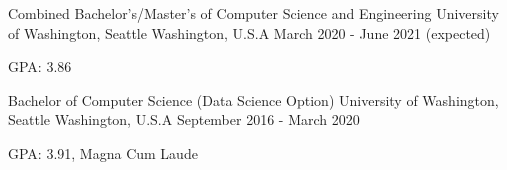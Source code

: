 

\begin{cventries}

  \cventry
    {Combined Bachelor's/Master's of Computer Science and Engineering} %
    {University of Washington, Seattle} %
    {Washington, U.S.A} %
    {March 2020 - June 2021 (expected)} %
    {
      \begin{cvitems} %
        \item {GPA: 3.86}
      \end{cvitems}
    }

  \cventry
    {Bachelor of Computer Science (Data Science Option)} %
    {University of Washington, Seattle} %
    {Washington, U.S.A} %
    {September 2016 - March 2020} %
    {
      \begin{cvitems} %
        \item {GPA: 3.91, Magna Cum Laude}
      \end{cvitems}
    }

\end{cventries}
